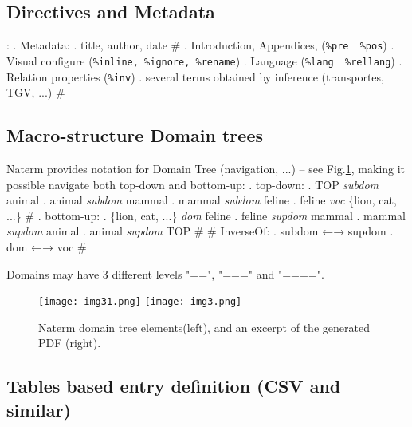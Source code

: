 \documentclass{ceurart}
\begin{document}
\subsection{Directives and Metadata}
:
. Metadata:
   . title, author, date
   #
. Introduction, Appendices, (\verb|%pre  %pos|)
. Visual configure (\verb|%inline, %ignore, %rename|)
. Language (\verb|%lang  %rellang|)
. Relation properties (\verb|%inv|)
. several terms obtained by inference (transportes, TGV, ...)
#

\subsection{Macro-structure Domain trees}

Naterm provides notation for Domain Tree (navigation, ...) 
-- see Fig.\ref{fig1}, making it possible navigate both top-down and
bottom-up:
.   top-down:
   . TOP    \emph{subdom} animal
   . animal \emph{subdom} mammal
   . mammal \emph{subdom} feline
   . feline \emph{voc} \{lion, cat, ...\}
   #
. bottom-up:
   . \{lion, cat, ...\} \emph{dom} feline
   . feline \emph{supdom} mammal
   . mammal \emph{supdom} animal
   . animal \emph{supdom} TOP
   #
#
InverseOf:
   . subdom ←→ supdom
   . dom ←→ voc
#

Domains may have 3 different levels "==", "===" and "====".

\begin{figure}
%
%
%
%
%
%
%
%
\noindent\texttt{[image: img31.png]}
\texttt{[image: img3.png]}
\caption{\label{fig1}Naterm domain tree elements(left), and an excerpt of the generated
PDF (right). }
\end{figure}

\subsection{Tables based entry definition (CSV and similar)}
\end{document}

